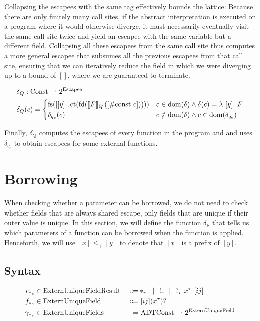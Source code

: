 Collapsing the escapees with the same tag effectively bounds the lattice: Because there are only finitely many call sites, if the abstract interpretation is executed on a program where it would otherwise diverge, it must necessarily eventually visit the same call site twice and yield an escapee with the same variable but a different field. Collapsing all these escapees from the same call site thus computes a more general escapee that subsumes all the previous escapees from that call site, ensuring that we can iteratively reduce the field in which we were diverging up to a bound of $[]$, where we are guaranteed to terminate.

\begin{align*}
	\delta_Q &: \mathrlap{\Const \rightharpoonup 2^{\Escapee}} \\
	\delta_Q&(c) = \begin{cases}
		\fs(|[y]|, \ct(\fd(\ecp{F}{[\#\text{const c}]}))) & c \in \dom(\delta) \land \delta(c) = \lambda\ [y].\ F \\
		\delta_{q_e}(c) & c \notin \dom(\delta) \land c \in \dom(\delta_{q_e})
	\end{cases}
\end{align*}

Finally, $\delta_Q$ computes the escapees of every function in the program and and uses $\delta_{q_e}$ to obtain escapees for some external functions.

\section{Borrowing}\label{sec:borrowing}
When checking whether a parameter can be borrowed, we do not need to check whether fields that are always shared escape, only fields that are unique if their outer value is unique. In this section, we will define the function $\delta_\mathbb{B}$ that tells us which parameters of a function can be borrowed when the function is applied. Henceforth, we will use $[x] \leq_+ [y]$ to denote that $[x]$ is a prefix of $[y]$.

\newcommand{\ExternUniqueFieldResult}{\mathrm{ExternUniqueFieldResult}}
\newcommand{\ExternUniqueField}{\mathrm{ExternUniqueField}}
\newcommand{\ExternUniqueFields}{\mathrm{ExternUniqueFields}}

\subsection{Syntax}

\begin{alignat*}{3}
	r_{*_e} &\in \ExternUniqueFieldResult\ &\Coloneqq& *_r \sep !_r \sep ?_r\ x^\tau\ [ij] \\
	f_{*_e} &\in \ExternUniqueField\ &\Coloneqq&\ [ij] (x^\tau)? \\
	\gamma_{*_e} &\in \ExternUniqueFields\ &=&\ \ADTConst \rightharpoonup 2^{\ExternUniqueField}
\end{alignat*}

